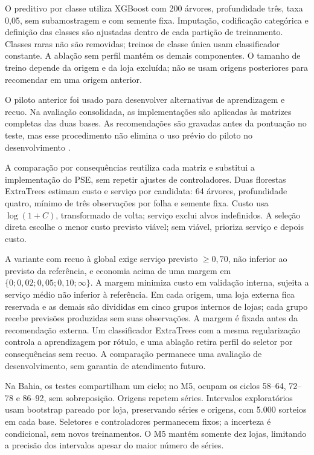 \documentclass[preprint,12pt]{elsarticle}
\begin{document}
O preditivo por classe utiliza XGBoost com 200 árvores, profundidade três, taxa 0,05, sem subamostragem e com semente fixa. Imputação, codificação categórica e definição das classes são ajustadas dentro de cada partição de treinamento. Classes raras não são removidas; treinos de classe única usam classificador constante. A ablação sem perfil mantém os demais componentes. O tamanho de treino depende da origem e da loja excluída; não se usam origens posteriores para recomendar em uma origem anterior.

O piloto anterior foi usado para desenvolver alternativas de aprendizagem e recuo. Na avaliação consolidada, as implementações são aplicadas às matrizes completas das duas bases. As recomendações são gravadas antes da pontuação no teste, mas esse procedimento não elimina o uso prévio do piloto no desenvolvimento \cite{CawleyTalbot2010}.

A comparação por consequências reutiliza cada matriz e substitui a implementação do PSE, sem repetir ajustes de controladores. Duas florestas ExtraTrees estimam custo e serviço por candidata: 64 árvores, profundidade quatro, mínimo de três observações por folha e semente fixa. Custo usa $\log(1+C)$, transformado de volta; serviço exclui alvos indefinidos. A seleção direta escolhe o menor custo previsto viável; sem viável, prioriza serviço e depois custo.

A variante com recuo à global exige serviço previsto $\geq0{,}70$, não inferior ao previsto da referência, e economia acima de uma margem em $\{0;0{,}02;0{,}05;0{,}10;\infty\}$. A margem minimiza custo em validação interna, sujeita a serviço médio não inferior à referência. Em cada origem, uma loja externa fica reservada e as demais são divididas em cinco grupos internos de lojas; cada grupo recebe previsões produzidas sem suas observações. A margem é fixada antes da recomendação externa. Um classificador ExtraTrees com a mesma regularização controla a aprendizagem por rótulo, e uma ablação retira perfil do seletor por consequências sem recuo. A comparação permanece uma avaliação de desenvolvimento, sem garantia de atendimento futuro.

Na Bahia, os testes compartilham um ciclo; no M5, ocupam os ciclos 58--64, 72--78 e 86--92, sem sobreposição. Origens repetem séries. Intervalos exploratórios usam bootstrap pareado por loja, preservando séries e origens, com 5.000 sorteios em cada base. Seletores e controladores permanecem fixos; a incerteza é condicional, sem novos treinamentos. O M5 mantém somente dez lojas, limitando a precisão dos intervalos apesar do maior número de séries.
\end{document}
